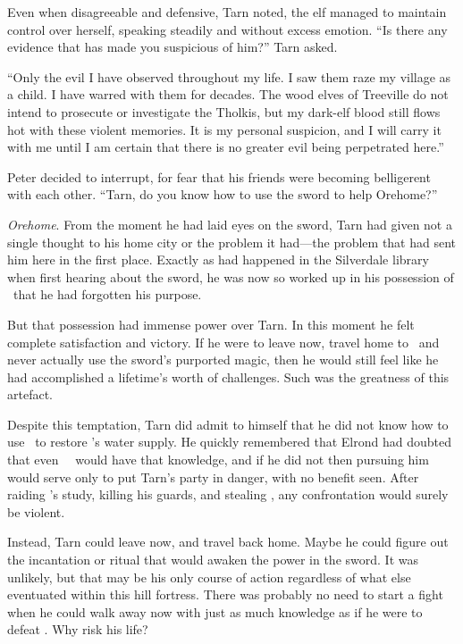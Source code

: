 Even when disagreeable and defensive, Tarn noted, the elf managed to maintain control over herself, speaking steadily and without excess emotion. ``Is there any evidence that has made you suspicious of him?''  Tarn asked.

``Only the evil I have observed throughout my life.  I saw them raze my village as a child.  I have warred with them for decades.  The wood elves of Treeville do not intend to prosecute or investigate the Tholkis, but my dark-elf blood still flows hot with these violent memories.  It is my personal suspicion, and I will carry it with me until I am certain that there is no greater evil being perpetrated here.''

Peter decided to interrupt, for fear that his friends were becoming belligerent with each other.  ``Tarn, do you know how to use the sword to help Orehome?''

\emph{Orehome}.  From the moment he had laid eyes on the sword, Tarn had given not a single thought to his home city or the problem it had---the problem that had sent him here in the first place.  Exactly as had happened in the Silverdale library when first hearing about the sword, he was now so worked up in his possession of \kildir\ that he had forgotten his purpose.

But that possession had immense power over Tarn.  In this moment he felt complete satisfaction and victory.  If he were to leave now, travel home to \korbarthrond\ and never actually use the sword's purported magic, then he would still feel like he had accomplished a lifetime's worth of challenges.  Such was the greatness of this artefact.

Despite this temptation, Tarn did admit to himself that he did not know how to use \kildir\ to restore \korbarthrond's water supply.  He quickly remembered that Elrond had doubted that even \mothzam\ \driktur\ would have that knowledge, and if he did not then pursuing him would serve only to put Tarn's party in danger, with no benefit seen.  After raiding \mothzam's study, killing his guards, and stealing \kildir, any confrontation would surely be violent.

Instead, Tarn could leave now, and travel back home.  Maybe he could figure out the incantation or ritual that would awaken the power in the sword.  It was unlikely, but that may be his only course of action regardless of what else eventuated within this hill fortress.  There was probably no need to start a fight when he could walk away now with just as much knowledge as if he were to defeat \mothzam.  Why risk his life?

